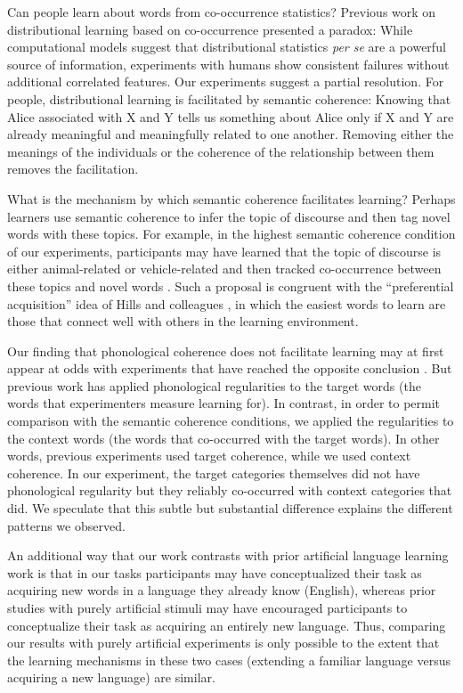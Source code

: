 \documentclass[man,floatsintext]{apa6}
\begin{document}
Can people learn about words from co-occurrence statistics? Previous work on distributional learning based on co-occurrence presented a paradox: While computational models suggest that distributional statistics \emph{per se} are a powerful source of information, experiments with humans show consistent failures without additional correlated features. Our experiments suggest a partial resolution. For people, distributional learning is facilitated by semantic coherence: Knowing that Alice associated with X and Y tells us something about Alice only if X and Y are already meaningful and meaningfully related to one another. Removing either the meanings of the individuals or the coherence of the relationship between them removes the facilitation.

What is the mechanism by which semantic coherence facilitates learning? Perhaps learners use semantic coherence to infer the topic of discourse and then tag novel words with these topics. For example, in the highest semantic coherence condition of our experiments, participants may have learned that the topic of discourse is either animal-related or vehicle-related and then tracked co-occurrence between these topics and novel words \citep{frank2013}. Such a proposal is congruent with the ``preferential acquisition'' idea of Hills and colleagues \citeyearpar{hills2009, hills2010}, in which the easiest words to learn are those that connect well with others in the learning environment.

Our finding that phonological coherence does not facilitate learning may at first appear at odds with experiments that have reached the opposite conclusion \citep{frigo1998, lany2010, monaghan2005}. But previous work has applied phonological regularities to the target words (the words that experimenters measure learning for).  In contrast, in order to permit comparison with the semantic coherence conditions, we applied the regularities to the context words (the words that co-occurred with the target words). In other words, previous experiments used target coherence, while we used context coherence. In our experiment, the target categories themselves did not have phonological regularity but they reliably co-occurred with context categories that did. We speculate that this subtle but substantial difference explains the different patterns we observed.

An additional way that our work contrasts with prior artificial language learning work is that in our tasks participants may have conceptualized their task as acquiring new words in a language they already know (English), whereas prior studies with purely artificial stimuli may have encouraged participants to conceptualize their task as acquiring an entirely new language. Thus, comparing our results with purely artificial experiments is only possible to the extent that the learning mechanisms in these two cases (extending a familiar language versus acquiring a new language) are similar.
\end{document}
